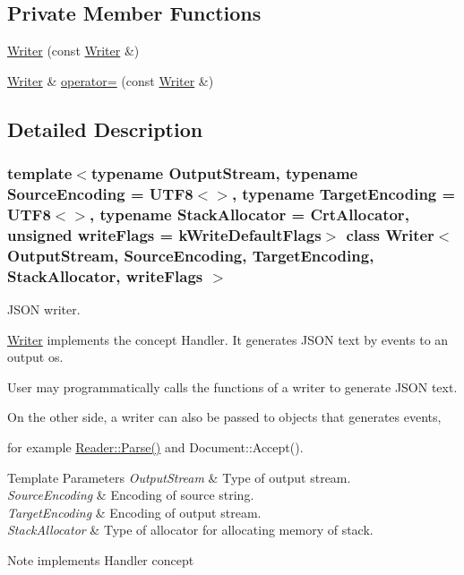 \subsection*{Private Member Functions}
\begin{DoxyCompactItemize}
\item 
\hyperlink{classWriter_a23d333973ed2cc4a315d482bd2acaa78}{Writer} (const \hyperlink{classWriter}{Writer} \&)
\item 
\hyperlink{classWriter}{Writer} \& \hyperlink{classWriter_ac033345791d1ff181715a588da16bde5}{operator=} (const \hyperlink{classWriter}{Writer} \&)
\end{DoxyCompactItemize}


\subsection{Detailed Description}
\subsubsection*{template$<$typename Output\+Stream, typename Source\+Encoding = U\+T\+F8$<$$>$, typename Target\+Encoding = U\+T\+F8$<$$>$, typename Stack\+Allocator = Crt\+Allocator, unsigned write\+Flags = k\+Write\+Default\+Flags$>$\newline
class Writer$<$ Output\+Stream, Source\+Encoding, Target\+Encoding, Stack\+Allocator, write\+Flags $>$}

J\+S\+ON writer. 

\hyperlink{classWriter}{Writer} implements the concept Handler. It generates J\+S\+ON text by events to an output os.

User may programmatically calls the functions of a writer to generate J\+S\+ON text.

On the other side, a writer can also be passed to objects that generates events,

for example \hyperlink{classGenericReader_a0c450620d14ff1824e58bb7bd9b42099}{Reader\+::\+Parse()} and Document\+::\+Accept().


\begin{DoxyTemplParams}{Template Parameters}
{\em Output\+Stream} & Type of output stream. \\
\hline
{\em Source\+Encoding} & Encoding of source string. \\
\hline
{\em Target\+Encoding} & Encoding of output stream. \\
\hline
{\em Stack\+Allocator} & Type of allocator for allocating memory of stack. \\
\hline
\end{DoxyTemplParams}
\begin{DoxyNote}{Note}
implements Handler concept 
\end{DoxyNote}


